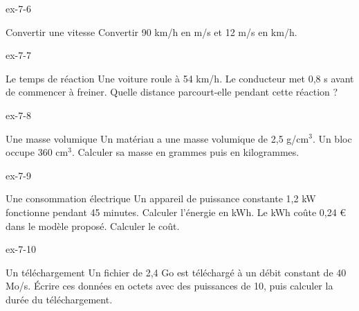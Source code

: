 \clearpage{}
\begin{blocLivre}{ex-7-6}\begin{exercice}[2]{Convertir une vitesse}
Convertir 90 km/h en m/s et 12 m/s en km/h.
\end{exercice}\end{blocLivre}
\begin{blocLivre}{ex-7-7}\begin{exercice}[2]{Le temps de réaction}
Une voiture roule à 54 km/h. Le conducteur met 0,8 s avant de commencer à freiner. Quelle distance parcourt-elle pendant cette réaction ?
\end{exercice}\end{blocLivre}
\begin{blocLivre}{ex-7-8}\begin{exercice}[2]{Une masse volumique}
Un matériau a une masse volumique de 2,5 g/cm$^3$. Un bloc occupe 360 cm$^3$. Calculer sa masse en grammes puis en kilogrammes.
\end{exercice}\end{blocLivre}
\begin{blocLivre}{ex-7-9}\begin{exercice}[2]{Une consommation électrique}
Un appareil de puissance constante 1,2 kW fonctionne pendant 45 minutes. Calculer l’énergie en kWh. Le kWh coûte 0,24 € dans le modèle proposé. Calculer le coût.
\end{exercice}\end{blocLivre}
\begin{blocLivre}{ex-7-10}\begin{exercice}[2]{Un téléchargement}
Un fichier de 2,4 Go est téléchargé à un débit constant de 40 Mo/s. Écrire ces données en octets avec des puissances de 10, puis calculer la durée du téléchargement.
\end{exercice}\end{blocLivre}

